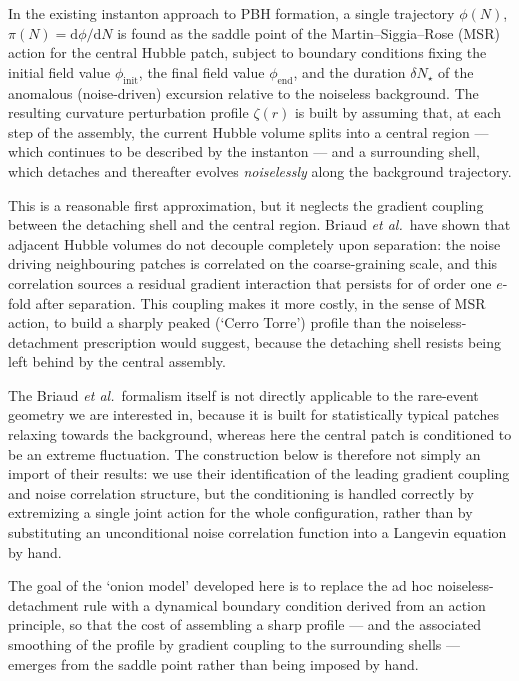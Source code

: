 \documentclass[a4paper,11pt]{article}
\newcommand{\etal}{\emph{et al.}}
\renewcommand{\d}{\mathrm{d}}
\newenvironment{panel}{\begin{tcolorbox}[enhanced,breakable,colback=gray!10,colframe=gray!30]\small}{\end{tcolorbox}}
\newcommand{\Ny}{N}                          %
\newcommand{\dNstar}{\delta N_\star}         %
\newcommand{\field}{\phi}                    %
\newcommand{\mom}{\pi}                       %
\newcommand{\phiinit}{\field_{\mathrm{init}}}
\newcommand{\phiend}{\field_{\mathrm{end}}}
\newcommand{\rad}{r}                         %
\newcommand{\zprofile}{\zeta}                %
\begin{document}
In the existing instanton approach to PBH formation, a single trajectory
$\field(\Ny)$, $\mom(\Ny) = \d\field/\d\Ny$ is found as the saddle point of
the Martin--Siggia--Rose (MSR) action for the central Hubble patch, subject
to boundary conditions fixing the initial field value $\phiinit$, the final
field value $\phiend$, and the duration $\dNstar$ of the anomalous
(noise-driven) excursion relative to the noiseless background. The
resulting curvature perturbation profile $\zprofile(\rad)$ is built by
assuming that, at each step of the assembly, the current Hubble volume
splits into a central region --- which continues to be described by the
instanton --- and a surrounding shell, which detaches and thereafter
evolves \emph{noiselessly} along the background trajectory.

This is a reasonable first approximation, but it neglects the gradient
coupling between the detaching shell and the central region. Briaud
\etal\ have shown that adjacent Hubble volumes do not decouple completely
upon separation: the noise driving neighbouring patches is correlated on
the coarse-graining scale, and this correlation sources a residual gradient
interaction that persists for of order one $e$-fold after separation. This
coupling makes it more costly, in the sense of MSR action, to build a
sharply peaked (`Cerro Torre') profile than the noiseless-detachment
prescription would suggest, because the detaching shell resists being left
behind by the central assembly.

\begin{panel}
The Briaud \etal\ formalism itself is not directly applicable to the
rare-event geometry we are interested in, because it is built for
statistically typical patches relaxing towards the background, whereas here
the central patch is conditioned to be an extreme fluctuation. The
construction below is therefore not simply an import of their results:
we use their identification of the leading gradient coupling and noise
correlation structure, but the conditioning is handled correctly by
extremizing a single joint action for the whole configuration, rather than
by substituting an unconditional noise correlation function into a Langevin
equation by hand.
\end{panel}

The goal of the `onion model' developed here is to replace the ad hoc
noiseless-detachment rule with a dynamical boundary condition derived from
an action principle, so that the cost of assembling a sharp profile ---
and the associated smoothing of the profile by gradient coupling to the
surrounding shells --- emerges from the saddle point rather than being
imposed by hand.
\end{document}
